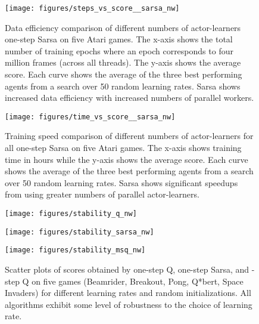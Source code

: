 \documentclass{article} \usepackage{times}
\begin{document}
\begin{figure}
\centerline{\texttt{[image: figures/steps\_vs\_score\_\_sarsa\_nw]}}
\caption{\label{fig-scalability-data-sarsa} Data efficiency comparison of different numbers of actor-learners one-step Sarsa on five Atari games. The x-axis shows the total number of training epochs where an epoch corresponds to four million frames (across all threads).  The y-axis shows the average score. Each curve shows the average of the three best performing agents from a search over 50 random learning rates. Sarsa shows increased data efficiency with increased numbers of parallel workers.}
\end{figure}

\begin{figure}
\centerline{\texttt{[image: figures/time\_vs\_score\_\_sarsa\_nw]}}
\caption{\label{fig-scalability-time-sarsa} Training speed comparison of different numbers of actor-learners for all one-step Sarsa on five Atari games. The x-axis shows training time in hours while the y-axis shows the average score.  Each curve shows the average of the three best performing agents from a search over 50 random learning rates.  Sarsa shows significant speedups from using greater numbers of parallel actor-learners.}
\end{figure}






\begin{figure}[t]
\centerline{\texttt{[image: figures/stability\_q\_nw]}}
\centerline{\texttt{[image: figures/stability\_sarsa\_nw]}}
\centerline{\texttt{[image: figures/stability\_msq\_nw]}}
\caption{\label{fig-stability-lr} Scatter plots of scores obtained by one-step Q, one-step Sarsa, and -step Q on five games (Beamrider, Breakout, Pong, Q*bert, Space Invaders) for  different learning rates and random initializations. All algorithms exhibit some level of robustness to the choice of learning rate.}
\end{figure}
\end{document}
